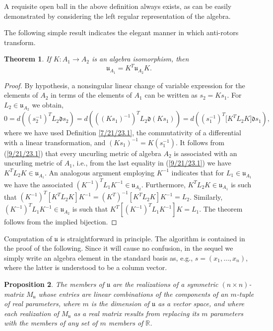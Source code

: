 \documentclass{amsart}
\numberwithin{equation}{section}
\newtheorem{theorem}{Theorem}
\newtheorem{proposition}[theorem]{Proposition}
\theoremstyle{definition}
\numberwithin{theorem}{section}
\begin{document}
   
     A requisite open ball in the above definition always exists, as can be easily demonstrated by considering the left regular representation of the algebra. 

The following simple result indicates the elegant manner in which anti-rotors transform.

\begin{theorem} \label{6/6/23.1} If $K:A_1\rightarrow A_2$ is an algebra isomorphism, then \begin{equation}\label{5/23/23.1} \mathfrak{u}_{A_1} = K^T \mathfrak{u}_{A_2} K. \end{equation} \end{theorem}

\begin{proof} By hypothesis, a nonsingular linear change of variable expression for the elements of $A_2$ in terms of the elements of $A_1$ can be written as $s_2= Ks_1$. \mbox{For $L_2\in \mathfrak{u}_{A_2}$} we obtain, \begin{equation} 0 = d\left((s_2^{-1})^T L_2 \mathfrak{d}s_2\right) =  d\left(((Ks_1)^{-1})^T L_2 \mathfrak{d}(Ks_1)\right) = d\left((s_1^{-1})^T \big[K^T L_2K\big]\mathfrak{d}s_1\right), \label{9/21/23.1}  \end{equation} where we have used Definition \ref{7/21/23.1}, the commutativity of a differential with a linear transformation, and $(Ks_1)^{-1} = K(s_1^{-1})$.   It follows from (\ref{9/21/23.1}) that every uncurling metric  of algebra $A_2$ is associated with an uncurling metric of $A_1$, i.e., from the last equality in (\ref{9/21/23.1}) we have  $K^TL_2K\in\mathfrak{u}_{A_1}$.  An analogous argument employing $K^{-1}$ indicates that for $L_1\in\mathfrak{u}_{A_1}$ we have the associated $(K^{-1})^T L_1 K^{-1} \in \mathfrak{u}_{A_2}$.    Furthermore, $K^T L_2K\in\mathfrak{u}_{A_1}$ is such that $(K^{-1})^T [K^T L_2 K]K^{-1} = (K^T)^{-1} [K^T L_2 K]K^{-1} = L_2$.  Similarly, $(K^{-1})^T L_1K^{-1}\in\mathfrak{u}_{A_2}$ is such that $K^T[(K^{-1})^T L_1K^{-1}] K = L_1$.  The theorem follows from the implied bijection. 
\end{proof}

Computation of $\mathfrak{u}$ is straightforward in principle.  The algorithm is contained in the proof of the following.  Since it will cause no confusion, in the sequel we simply write an algebra element in the standard basis as, e.g., $s=(x_1,\dots,x_n)$, where the latter is understood to be a column vector.

\begin{proposition}\label{9/2/24.1} The members of $\mathfrak{u}$ are the realizations of a symmetric $(n\times n)$-matrix $M_{\mathfrak{u}}$ whose entries are linear combinations of the components of an $m$-tuple of real parameters, where $m$ is the dimension of $\mathfrak{u}$ as a vector space, and where each realization of $M_{\mathfrak{u}}$ as a real matrix results from replacing its $m$ parameters with the members of any set of $m$ members of $\mathbb{R}$.   
\end{proposition}
\end{document}

